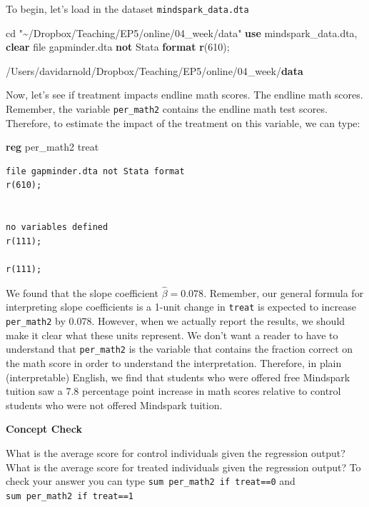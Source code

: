 \documentclass[
]{book}
\newenvironment{Shaded}{\begin{snugshade}}{\end{snugshade}}
\newcommand{\FunctionTok}[1]{\textcolor[rgb]{0.13,0.29,0.53}{\textbf{#1}}}
\newcommand{\KeywordTok}[1]{\textcolor[rgb]{0.13,0.29,0.53}{\textbf{#1}}}
\newcommand{\NormalTok}[1]{#1}
\newcommand{\StringTok}[1]{\textcolor[rgb]{0.31,0.60,0.02}{#1}}
\begin{document}
To begin, let's load in the dataset \texttt{mindspark\_data.dta}

\begin{Shaded}
\begin{Highlighting}[]
\NormalTok{cd }\StringTok{"\textasciitilde{}/Dropbox/Teaching/EP5/online/04\_week/data"}
\KeywordTok{use}\NormalTok{ mindspark\_data.dta, }\KeywordTok{clear} 
\NormalTok{file gapminder.dta }\KeywordTok{not}\NormalTok{ Stata }\KeywordTok{format}
\FunctionTok{r}\NormalTok{(610);}


\NormalTok{/Users/davidarnold/Dropbox/Teaching/EP5/online/04\_week/}\KeywordTok{data}
\end{Highlighting}
\end{Shaded}

Now, let's see if treatment impacts endline math scores. The endline math scores. Remember, the variable \texttt{per\_math2} contains the endline math test scores. Therefore, to estimate the impact of the treatment on this variable, we can type:

\begin{Shaded}
\begin{Highlighting}[]
\KeywordTok{reg}\NormalTok{ per\_math2 treat}
\end{Highlighting}
\end{Shaded}

\begin{verbatim}
file gapminder.dta not Stata format
r(610);


no variables defined
r(111);

r(111);
\end{verbatim}

We found that the slope coefficient \(\hat{\beta}=0.078\). Remember, our general formula for interpreting slope coefficients is a 1-unit change in \texttt{treat} is expected to increase \texttt{per\_math2} by 0.078. However, when we actually report the results, we should make it clear what these units represent. We don't want a reader to have to understand that \texttt{per\_math2} is the variable that contains the fraction correct on the math score in order to understand the interpretation. Therefore, in plain (interpretable) English, we find that students who were offered free Mindspark tuition saw a 7.8 percentage point increase in math scores relative to control students who were not offered Mindspark tuition.

\textbf{Concept Check}

What is the average score for control individuals given the regression output? What is the average score for treated individuals given the regression output? To check your answer you can type \texttt{sum\ per\_math2\ if\ treat==0} and \texttt{sum\ per\_math2\ if\ treat==1}
\end{document}
